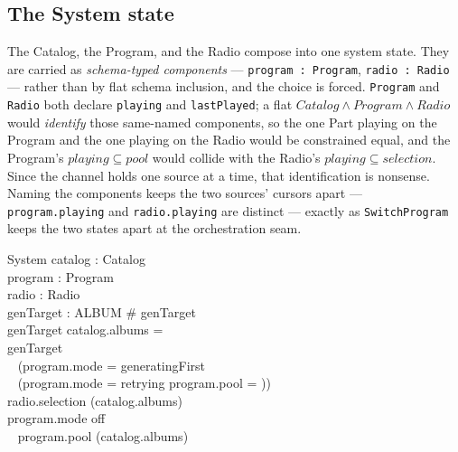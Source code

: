 \documentclass[a4paper,10pt,fleqn]{article}
\begin{document}
\subsection{The System state}
\label{sec:system}

The Catalog, the Program, and the Radio compose into one system state. They are
carried as \emph{schema-typed components} --- \texttt{program : Program},
\texttt{radio : Radio} --- rather than by flat schema inclusion, and the choice
is forced. \texttt{Program} and \texttt{Radio} both declare \texttt{playing} and
\texttt{lastPlayed}; a flat $Catalog \land Program \land Radio$ would
\emph{identify} those same-named components, so the one Part playing on the
Program and the one playing on the Radio would be constrained equal, and the
Program's $playing \subseteq pool$ would collide with the Radio's
$playing \subseteq selection$. Since the channel holds one source at a time,
that identification is nonsense. Naming the components keeps the two sources'
cursors apart --- \texttt{program.playing} and \texttt{radio.playing} are
distinct --- exactly as \texttt{SwitchProgram} keeps the two states apart at the
orchestration seam.

\begin{schema}{System}
  catalog : Catalog \\
  program : Program \\
  radio : Radio \\
  genTarget : \power ALBUM
  \where
  \# genTarget  \\
  genTarget \cap \dom catalog.albums = \emptyset \\
  genTarget \neq \emptyset \iff \\
  \quad~ (program.mode = generatingFirst \\
  \quad~ \lor (program.mode = retrying \land program.pool = \emptyset)) \\
  radio.selection \subseteq \bigcup (\ran catalog.albums) \\
  program.mode \neq off \implies \\
  \quad~ program.pool \subseteq \bigcup (\ran catalog.albums)
\end{schema}
\end{document}

